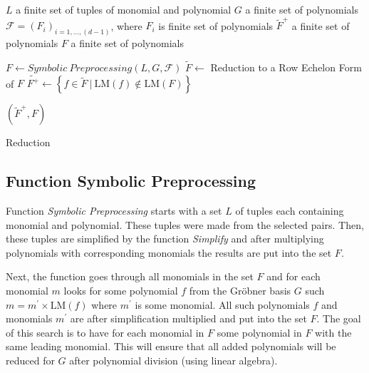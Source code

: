 \begin{algorithm}[ht]
  \begin{algorithmic}[1]
    \Require
      \Statex $L$ a finite set of tuples of monomial and polynomial
      \Statex $G$ a finite set of polynomials
      \Statex $\mathcal{F} = (F_i)_{i=1,\ldots,(d-1)}$, where $F_i$ is finite set of polynomials
    \Ensure
      \Statex $\tilde{F}^+$ a finite set of polynomials
      \Statex $F$ a finite set of polynomials
      \Statex

    \State $F \gets Symbolic\ Preprocessing(L, G, \mathcal{F})$
    \State $\tilde{F} \gets$ Reduction to a Row Echelon Form of $F$
    \State $\tilde{F^+} \gets \left\{f \in \tilde{F}\ |\ \textrm{LM}(f) \notin \textrm{LM}(F)\right\}$

    \State \Return $(\tilde{F}^+, F)$

  \end{algorithmic}
  \caption{Reduction}
\end{algorithm}

\subsection{Function Symbolic Preprocessing}
Function \textit{Symbolic Preprocessing} starts with a set $L$ of tuples each containing monomial and polynomial. These tuples were made from the selected pairs. Then, these tuples are simplified by the function \textit{Simplify} and after multiplying polynomials with corresponding monomials the results are put into the set $F$.

Next, the function goes through all monomials in the set $F$ and for each monomial $m$ looks for some polynomial $f$ from the Gr\"obner basis $G$ such $m = m^\prime \times \textrm{LM}(f)$ where $m^\prime$ is some monomial. All such polynomials $f$ and monomials $m^\prime$ are after simplification multiplied and put into the set $F$. The goal of this search is to have for each monomial in $F$ some polynomial in $F$ with the same leading monomial. This will ensure that all added polynomials will be reduced for $G$ after polynomial division (using linear algebra).

